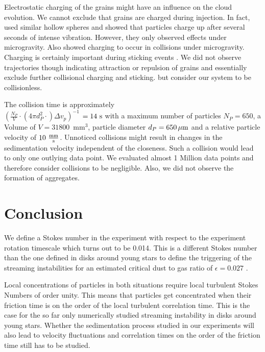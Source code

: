 {Electrostatic charging of the grains might have an influence on the cloud evolution. We cannot exclude that grains are charged during injection. In fact, 
\citet{yoshimatsu2017} used similar hollow spheres and showed that particles charge up after several seconds of intense vibration.
However, they only observed effects under microgravity. Also \citet{Jungmann2018} showed charging to occur in collisions under microgravity. Charging  is certainly important during sticking events \citep{lee2015}. We did not observe trajectories though indicating attraction or repulsion of grains and essentially exclude further collisional charging and sticking. 
{but consider our} system to be collisionless. 

{The collision time is approximately\\ 
$( \frac{N_P}{V}\cdot (4\pi d_P^2\cdot) \Delta v_p )^{-1}$ $= 14~\rm s$ with a maximum number of particles $N_P = 650$, a Volume of $V=31800$~mm$^3$, particle diameter $d_P=650\, \rm \mu m$ and a relative particle velocity of $10~\rm \frac{mm}{s}$}. {Unnoticed collisions might result in changes in the sedimentation velocity independent of the closeness. Such a collision would lead to only one outlying data point.  We evaluated almost 1 Million data points and therefore consider collisions to be negligible.}  {Also, }we did not observe the formation of aggregates.}

\section{Conclusion}

We define a Stokes number {in the experiment} with respect to the experiment rotation timescale which turns out to be 0.014. 
This is a different Stokes number than the one defined in disks around young stars to define the triggering of the streaming instabilities for an estimated critical dust to gas ratio of $\epsilon = 0.027$ \citep{yang2017}.

{Local concentrations of particles in both situations require local turbulent Stokes Numbers of order unity. This means that particles get concentrated when their friction time is on the order of the local turbulent correlation time. This is the case for the so far only numerically studied streaming instability in disks around young stars. Whether the sedimentation process studied in our experiments will also lead to velocity fluctuations and correlation times on the order of the friction time still has to be studied.}

